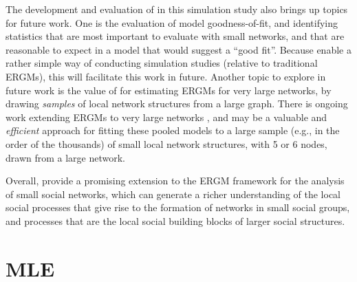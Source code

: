 \documentclass[review, nonatbib,doubleblind]{elsarticle/elsarticle}
\begin{document}
The development and evaluation of \ergmitos{} in this simulation study also brings up topics for future work. One is the evaluation of model goodness-of-fit, and identifying statistics that are most important to evaluate with small networks, and that are reasonable to expect in a model that would suggest a ``good fit''. Because \ergmitos{} enable a rather simple way of conducting simulation studies (relative to traditional ERGMs), this will facilitate this work in future. Another topic to explore in future work is the value of \ergmitos{} for estimating ERGMs for very large networks, by drawing \textit{samples} of local network structures from a large graph. There is ongoing work extending ERGMs to very large networks \cite{stivala2019exponential,STIVALA2016167}, and \ergmitos{} may be a valuable and \textit{efficient} approach for fitting these pooled models to a large sample (e.g., in the order of the thousands) of small local network structures, with 5 or 6 nodes, drawn from a large network. 

Overall,  \ergmitos{} provide a promising extension to the ERGM framework for the analysis of small social networks, which can generate a richer understanding of the local social processes that give rise to the formation of networks in small social groups, and processes that are the local social building blocks of larger social structures. 





\nocite{VegaYon2019,R,butts2016,Wickham2016,Leifeld2013}
\printbibliography

\appendix

\section{MLE\label{appendix:mle}}
\end{document}
